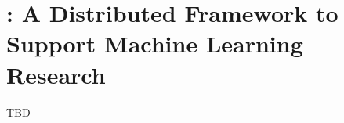 
\section{\iris: A Distributed Framework to Support Machine Learning Research}
\label{sec:approach}

TBD